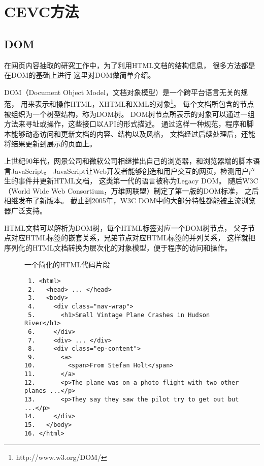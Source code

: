 \section{CEVC方法}
\label{sec:cevc-method}

\subsection{DOM}
\label{subsec:dom}
在网页内容抽取的研究工作中，为了利用HTML文档的结构信息，
很多方法都是在DOM的基础上进行
这里对DOM做简单介绍。

DOM（Document Object Model，文档对象模型）是一个跨平台语言无关的规范，
用来表示和操作HTML，XHTML和XML的对象\footnote{http://www.w3.org/DOM/}。
每个文档所包含的节点被组织为一个树型结构，称为DOM树。
DOM树节点所表示的对象可以通过一组方法来寻址或操作，这些接口以API的形式描述。
通过这样一种规范，程序和脚本能够动态访问和更新文档的内容、结构以及风格，
文档经过后续处理后，还能将结果更新到展示的页面上。

上世纪90年代，网景公司和微软公司相继推出自己的浏览器，和浏览器端的脚本语言JavaScript。
JavaScript让Web开发者能够创造和用户交互的网页，检测用户产生的事件并更新HTML文档，
这类第一代的语言被称为Legacy DOM。
随后W3C（World Wide Web Consortium，万维网联盟）制定了第一版的DOM标准，
之后相继发布了新版本。
截止到2005年，W3C DOM中的大部分特性都能被主流浏览器广泛支持。

HTML文档可以解析为DOM树，每个HTML标签对应一个DOM树节点，
父子节点对应HTML标签的嵌套关系，兄弟节点对应HTML标签的并列关系，
这样就把序列化的HTML文档转换为层次化的对象模型，便于程序的访问和操作。

\begin{figure}[htbp]
\begin{example}
\label{ex:html}
一个简化的HTML代码片段
\end{example}
\begin{verbatim}
 1. <html>
 2.   <head> ... </head>
 3.   <body>
 4.     <div class="nav-wrap">
 5.       <h1>Small Vintage Plane Crashes in Hudson River</h1>
 6.     </div>
 7.     <div> ... </div>
 8.     <div class="ep-content">
 9.       <a>
10.         <span>From Stefan Holt</span>
11.       </a>
12.       <p>The plane was on a photo flight with two other planes ...</p>
13.       <p>They say they saw the pilot try to get out but ...</p>
14.     </div>
15.   </body>
16. </html>
\end{verbatim}
\end{figure}

